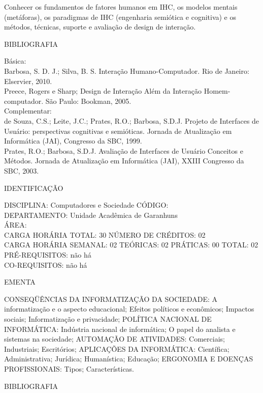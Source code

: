 \documentclass[
	12pt,				%
	openright,			%
  oneside,     %
	a4paper,			%
	chapter=TITLE,		%
	english,			%
	french,				%
	spanish,			%
	brazil				%
	]{abntex2}
\begin{document}
\begin{apendicesenv}
Conhecer os fundamentos de fatores humanos em IHC, os modelos mentais
(metáforas), os paradigmas de IHC (engenharia semiótica e cognitiva) e
os métodos, técnicas, suporte e avaliação de design de interação.

BIBLIOGRAFIA 

Básica:\\
Barbosa, S. D. J.; Silva, B. S. Interação Humano-Computador. Rio de
Janeiro: Elservier, 2010.\\
Preece, Rogers e Sharp; Design de Interação  Além da Interação
Homem-computador. São Paulo: Bookman, 2005.\\
Complementar:\\
de Souza, C.S.; Leite, J.C.; Prates, R.O.; Barbosa, S.D.J. Projeto de
Interfaces de Usuário: perspectivas cognitivas e semióticas. Jornada de
Atualização em Informática (JAI), Congresso da SBC, 1999.\\
Prates, R.O.; Barbosa, S.D.J. Avaliação de Interfaces de Usuário 
Conceitos e Métodos. Jornada de Atualização em Informática (JAI), XXIII
Congresso da SBC, 2003.

\newpage IDENTIFICAÇÃO

DISCIPLINA: Computadores e Sociedade CÓDIGO:\\ 
DEPARTAMENTO: Unidade Acadêmica de Garanhuns\\
ÁREA: \\
CARGA HORÁRIA TOTAL: 30 NÚMERO DE CRÉDITOS: 02\\
CARGA HORÁRIA SEMANAL: 02 TEÓRICAS: 02 PRÁTICAS: 00 TOTAL: 02\\
PRÉ-REQUISITOS: não há\\
CO-REQUISITOS: não há

EMENTA 

CONSEQÜÊNCIAS DA INFORMATIZAÇÃO DA SOCIEDADE: A informatização e o
aspecto educacional; Efeitos políticos e econômicos; Impactos sociais;
Informatização e privacidade; POLÍTICA NACIONAL DE INFORMÁTICA:
Indústria nacional de informática; O papel do analista e sistemas na
sociedade; AUTOMAÇÃO DE ATIVIDADES: Comerciais; Industriais;
Escritórios; APLICAÇÕES DA INFORMÁTICA: Científica; Administrativa;
Jurídica; Humanística; Educação; ERGONOMIA E DOENÇAS PROFISSIONAIS:
Tipos; Características.

BIBLIOGRAFIA 


\end{apendicesenv}
\end{document}
